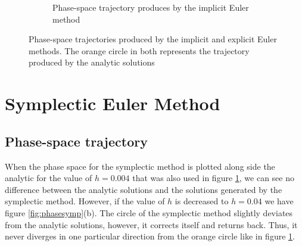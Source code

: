 \documentclass{article}
\begin{document}
\begin{figure}[h]
\begin{subfigure}{0.7\textwidth}
    \caption{Phase-space trajectory produces by the implicit Euler method}
    \end{subfigure}
    \caption{Phase-space trajectories produced by the implicit and explicit Euler methods. The orange circle in both represents the trajectory produced by the analytic solutions}
    \label{fig:phase}
\end{figure}

\section{Symplectic Euler Method}
\subsection{Phase-space trajectory}
When the phase space for the symplectic method is plotted along side the analytic for the value of $h=0.004$ that was also used in figure \ref{fig:phase}, we can see no difference between the analytic solutions and the solutions generated by the symplectic method. However, if the value of $h$ is decreased to $h=0.04$ we have figure \ref{fig:phasesymp}(b). The circle of the symplectic method slightly deviates from the analytic solutions, however, it corrects itself and returns back. Thus, it never diverges in one particular direction from the orange circle like in figure \ref{fig:phase}. 
\end{document}
